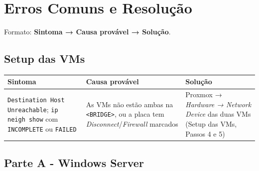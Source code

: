 
\chapter*{Erros Comuns e Resolução}

Formato: \textbf{Sintoma → Causa provável → Solução}.

\label{ec-setup}

\section*{Setup das VMs}

\begin{center}\small
\begin{tabularx}{\linewidth}{|>{\raggedright\arraybackslash}X|>{\raggedright\arraybackslash}X|>{\raggedright\arraybackslash}X|}
\hline
\rowcolor{azul!10}\textbf{Sintoma} & \textbf{Causa provável} & \textbf{Solução} \\
\hline
\texttt{Destination Host Unreachable}; \texttt{ip neigh show} com \texttt{INCOMPLETE} ou \texttt{FAILED} & As VMs não estão ambas na \texttt{\textless{}BRIDGE\textgreater{}}, ou a placa tem \emph{Disconnect}/\emph{Firewall} marcados & Proxmox → \emph{Hardware → Network Device} das duas VMs (Setup das VMs, Passos 4 e 5) \\
\hline
\end{tabularx}
\end{center}

\label{ec-a}

\section*{Parte A - Windows Server}

